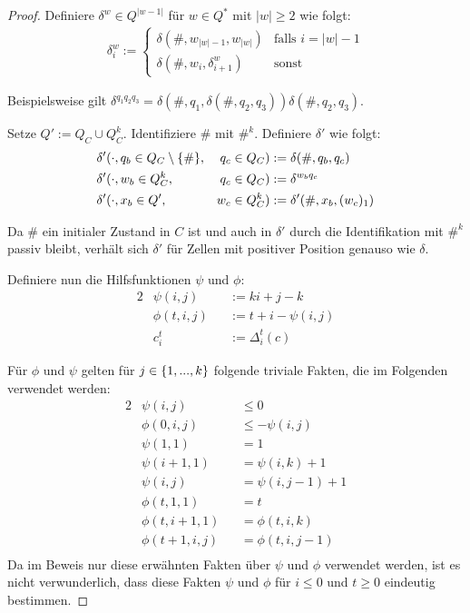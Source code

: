 \begin{proof}
    Definiere $\delta^{w} \in Q^{|w-1|}$ für $w \in Q^*$ mit $|w| \geq 2$ wie folgt:
    \begin{align*}
        \delta^{w}_i := \begin{cases}
            \delta(\#, w_{|w|-1}, w_{|w|}) & \text{falls } i = |w| - 1 \\
            \delta(\#, w_{i}, \delta^{w}_{i+1}) & \text{sonst}
        \end{cases}
    \end{align*}

    Beispielsweise gilt $\delta^{q_1q_2q_3} = \delta(\#, q_1, \delta(\#, q_2, q_3))\delta(\#, q_2, q_3)$.
    
    Setze $Q' := Q_C \cup Q_C^k$. Identifiziere $\#$ mit $\#^k$. Definiere $\delta'$ wie folgt:
    \begin{alignat*}{2}
        & \delta'(\cdot, q_b \in Q_C \setminus \{ {\#} \}, & q_c \in Q_C) & := \delta(\#, q_b, q_c) \\
        & \delta'(\cdot, w_b \in Q_C^k, & q_c \in Q_C) & := \delta^{w_bq_c} \\
        & \delta'(\cdot, x_b \in Q', & w_c \in Q^k_C) & := \delta'(\#, x_b, (w_c)_1)
    \end{alignat*}
    
    Da $\#$ ein initialer Zustand in $C$ ist und auch in $\delta'$ durch die Identifikation mit $\#^k$ passiv bleibt, verhält sich $\delta'$ für Zellen mit positiver Position genauso wie $\delta$.
    
    Definiere nun die Hilfsfunktionen $\psi$ und $\phi$:
    \begin{alignat*}{2}
        & \psi(i, j) && := ki+j-k \\
        & \phi(t, i, j) && := t + i - \psi(i, j) \\
        & c^t_i && := \Delta^t_i(c)
    \end{alignat*}

    Für $\phi$ und $\psi$ gelten für $j \in \{ {1, ..., k} \}$ folgende triviale Fakten, die im Folgenden verwendet werden:
    \begin{alignat*}{2}
        & \psi(i, j) && \leq 0 \\
        & \phi(0, i, j) && \leq -\psi(i, j) \\
        & \psi(1, 1) && = 1 \\
        & \psi(i + 1, 1) && = \psi(i, k) + 1 \\
        & \psi(i, j) && = \psi(i, j - 1) + 1 \\
        & \phi(t, 1, 1) && = t \\
        & \phi(t, i+1, 1) && = \phi(t, i, k) \\
        & \phi(t + 1, i, j) && = \phi(t, i, j-1) \\
    \end{alignat*}
    Da im Beweis nur diese erwähnten Fakten über $\psi$ und $\phi$ verwendet werden, ist es nicht verwunderlich, dass diese Fakten $\psi$ und $\phi$ für $i \leq 0$ und $t \geq 0$ eindeutig bestimmen.


\end{proof}
